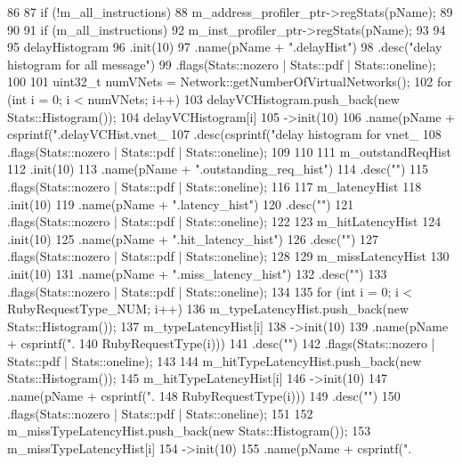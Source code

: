\begin{DoxyCode}
86 {
87     if (!m_all_instructions) {
88         m_address_profiler_ptr->regStats(pName);
89     }
90 
91     if (m_all_instructions) {
92         m_inst_profiler_ptr->regStats(pName);
93     }
94 
95     delayHistogram
96         .init(10)
97         .name(pName + ".delayHist")
98         .desc("delay histogram for all message")
99         .flags(Stats::nozero | Stats::pdf | Stats::oneline);
100 
101     uint32_t numVNets = Network::getNumberOfVirtualNetworks();
102     for (int i = 0; i < numVNets; i++) {
103         delayVCHistogram.push_back(new Stats::Histogram());
104         delayVCHistogram[i]
105             ->init(10)
106             .name(pName + csprintf(".delayVCHist.vnet_%
107             .desc(csprintf("delay histogram for vnet_%
108             .flags(Stats::nozero | Stats::pdf | Stats::oneline);
109     }
110 
111     m_outstandReqHist
112         .init(10)
113         .name(pName + ".outstanding_req_hist")
114         .desc("")
115         .flags(Stats::nozero | Stats::pdf | Stats::oneline);
116 
117     m_latencyHist
118         .init(10)
119         .name(pName + ".latency_hist")
120         .desc("")
121         .flags(Stats::nozero | Stats::pdf | Stats::oneline);
122 
123     m_hitLatencyHist
124         .init(10)
125         .name(pName + ".hit_latency_hist")
126         .desc("")
127         .flags(Stats::nozero | Stats::pdf | Stats::oneline);
128 
129     m_missLatencyHist
130         .init(10)
131         .name(pName + ".miss_latency_hist")
132         .desc("")
133         .flags(Stats::nozero | Stats::pdf | Stats::oneline);
134 
135     for (int i = 0; i < RubyRequestType_NUM; i++) {
136         m_typeLatencyHist.push_back(new Stats::Histogram());
137         m_typeLatencyHist[i]
138             ->init(10)
139             .name(pName + csprintf(".%
140                                     RubyRequestType(i)))
141             .desc("")
142             .flags(Stats::nozero | Stats::pdf | Stats::oneline);
143 
144         m_hitTypeLatencyHist.push_back(new Stats::Histogram());
145         m_hitTypeLatencyHist[i]
146             ->init(10)
147             .name(pName + csprintf(".%
148                                     RubyRequestType(i)))
149             .desc("")
150             .flags(Stats::nozero | Stats::pdf | Stats::oneline);
151 
152         m_missTypeLatencyHist.push_back(new Stats::Histogram());
153         m_missTypeLatencyHist[i]
154             ->init(10)
155             .name(pName + csprintf(".%
}}
\end{DoxyCode}
